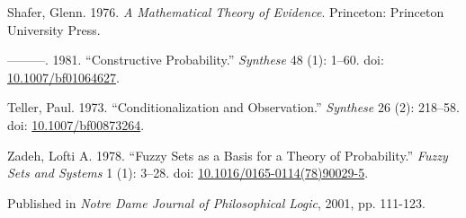 \documentclass[
  10pt,
  letterpaper,
  DIV=11,
  numbers=noendperiod,
  twoside]{scrartcl}
\newlength{\cslhangindent}
\newenvironment{CSLReferences}[2] %
 {\begin{list}{}{%
  \setlength{\itemindent}{0pt}
  \setlength{\leftmargin}{0pt}
  \setlength{\parsep}{0pt}
  \ifodd #1
   \setlength{\leftmargin}{\cslhangindent}
   \setlength{\itemindent}{-1\cslhangindent}
  \fi
  \setlength{\itemsep}{#2\baselineskip}}}
 {\end{list}}
\begin{document}
\begin{CSLReferences}{1}{0}
Shafer, Glenn. 1976. \emph{A Mathematical Theory of Evidence}.
Princeton: Princeton University Press.

---------. 1981. {``Constructive Probability.''} \emph{Synthese} 48 (1):
1--60. doi:
\href{https://doi.org/10.1007/bf01064627}{10.1007/bf01064627}.

Teller, Paul. 1973. {``Conditionalization and Observation.''}
\emph{Synthese} 26 (2): 218--58. doi:
\href{https://doi.org/10.1007/bf00873264}{10.1007/bf00873264}.

Zadeh, Lofti A. 1978. {``Fuzzy Sets as a Basis for a Theory of
Probability.''} \emph{Fuzzy Sets and Systems} 1 (1): 3--28. doi:
\href{https://doi.org/10.1016/0165-0114(78)90029-5}{10.1016/0165-0114(78)90029-5}.

\end{CSLReferences}



\noindent Published in\emph{
Notre Dame Journal of Philosophical Logic}, 2001, pp. 111-123.
\end{document}
